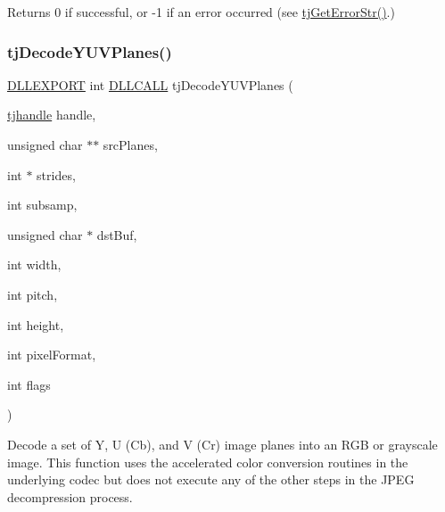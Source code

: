 \begin{DoxyReturn}{Returns}
0 if successful, or -\/1 if an error occurred (see \hyperlink{group___turbo_j_p_e_g_ga9af79c908ec131b1ae8d52fe40375abf}{tj\+Get\+Error\+Str()}.) 
\end{DoxyReturn}
\mbox{\label{group___turbo_j_p_e_g_ga6cb5b0e1101a2b20edea576e11faf93d}} 
\subsubsection{\texorpdfstring{tj\+Decode\+Y\+U\+V\+Planes()}{tjDecodeYUVPlanes()}}
{\footnotesize\ttfamily \hyperlink{turbojpeg_8h_a808e08638be3cba36e36759e5b150de0}{D\+L\+L\+E\+X\+P\+O\+RT} int \hyperlink{turbojpeg_8h_a54b25836118bfac94a53a7b790f3ccb2}{D\+L\+L\+C\+A\+LL} tj\+Decode\+Y\+U\+V\+Planes (\begin{DoxyParamCaption}\item[{\hyperlink{group___turbo_j_p_e_g_ga758d2634ecb4949de7815cba621f5763}{tjhandle}}]{handle,  }\item[{unsigned char $\ast$$\ast$}]{src\+Planes,  }\item[{int $\ast$}]{strides,  }\item[{int}]{subsamp,  }\item[{unsigned char $\ast$}]{dst\+Buf,  }\item[{int}]{width,  }\item[{int}]{pitch,  }\item[{int}]{height,  }\item[{int}]{pixel\+Format,  }\item[{int}]{flags }\end{DoxyParamCaption})}

Decode a set of Y, U (Cb), and V (Cr) image planes into an R\+GB or grayscale image. This function uses the accelerated color conversion routines in the underlying codec but does not execute any of the other steps in the J\+P\+EG decompression process.


